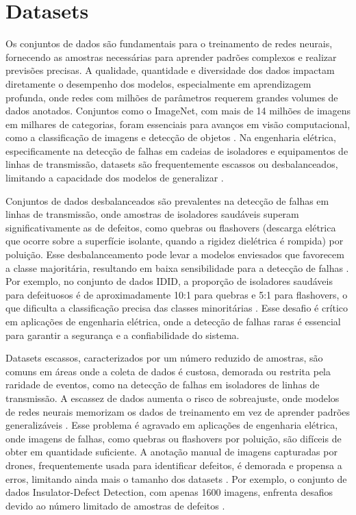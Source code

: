 \section{Datasets}

Os conjuntos de dados são fundamentais para o treinamento de redes neurais, fornecendo as amostras necessárias para aprender padrões complexos e realizar previsões precisas. A qualidade, quantidade e diversidade dos dados impactam diretamente o desempenho dos modelos, especialmente em aprendizagem profunda, onde redes com milhões de parâmetros requerem grandes volumes de dados anotados. Conjuntos como o ImageNet, com mais de 14 milhões de imagens em milhares de categorias, foram essenciais para avanços em visão computacional, como a classificação de imagens e detecção de objetos \cite{deng2009imagenet}. Na engenharia elétrica, especificamente na detecção de falhas em cadeias de isoladores e equipamentos de linhas de transmissão, datasets são frequentemente escassos ou desbalanceados, limitando a capacidade dos modelos de generalizar \cite{shorten2019survey}.

Conjuntos de dados desbalanceados são prevalentes na detecção de falhas em linhas de transmissão, onde amostras de isoladores saudáveis superam significativamente as de defeitos, como quebras ou flashovers (descarga elétrica que ocorre sobre a superfície isolante, quando a rigidez dielétrica é rompida) por poluição. Esse desbalanceamento pode levar a modelos enviesados que favorecem a classe majoritária, resultando em baixa sensibilidade para a detecção de falhas \cite{he2009learning}. Por exemplo, no conjunto de dados IDID, a proporção de isoladores saudáveis para defeituosos é de aproximadamente 10:1 para quebras e 5:1 para flashovers, o que dificulta a classificação precisa das classes minoritárias \cite{oberweger2024xai}. Esse desafio é crítico em aplicações de engenharia elétrica, onde a detecção de falhas raras é essencial para garantir a segurança e a confiabilidade do sistema.

Datasets escassos, caracterizados por um número reduzido de amostras, são comuns em áreas onde a coleta de dados é custosa, demorada ou restrita pela raridade de eventos, como na detecção de falhas em isoladores de linhas de transmissão. A escassez de dados aumenta o risco de sobreajuste, onde modelos de redes neurais memorizam os dados de treinamento em vez de aprender padrões generalizáveis \cite{goodfellow2016deep}. Esse problema é agravado em aplicações de engenharia elétrica, onde imagens de falhas, como quebras ou flashovers por poluição, são difíceis de obter em quantidade suficiente. A anotação manual de imagens capturadas por drones, frequentemente usada para identificar defeitos, é demorada e propensa a erros, limitando ainda mais o tamanho dos datasets \cite{zheng2022improved}. Por exemplo, o conjunto de dados Insulator-Defect Detection, com apenas 1600 imagens, enfrenta desafios devido ao número limitado de amostras de defeitos \cite{zheng2022improved}.

